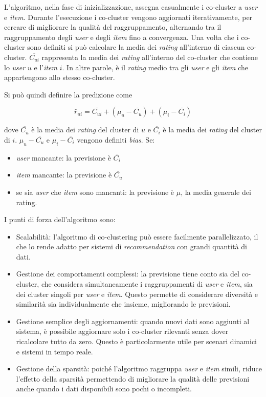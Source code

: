 L'algoritmo, nella fase di inizializzazione, assegna casualmente i co-cluster a \textit{user} e \textit{item}. Durante l'esecuzione i co-cluster vengono aggiornati iterativamente, per cercare di migliorare la qualità del raggruppamento, alternando tra il raggruppamento degli \textit{user} e degli \textit{item} fino a convergenza. Una volta che i co-cluster sono definiti si può calcolare la media dei \textit{rating} all'interno di ciascun co-cluster. $ \overline{C_{ui}} $ rappresenta la media dei \textit{rating} all'interno del co-cluster che contiene lo \textit{user} $ u $ e l'\textit{item} $ i $. In altre parole, è il \textit{rating} medio tra gli \textit{user} e gli \textit{item} che appartengono allo stesso co-cluster.

Si può quindi definire la predizione come

\[
\hat{r}_{ui} = \overline{C_{ui}} + (\mu_u - \overline{C_u}) + (\mu_i - \overline{C_i})
\]

dove $\overline{C_u}$ è la media dei \textit{rating} del cluster di $u$ e $\overline{C_i}$ è la media dei \textit{rating} del cluster di $i$. $ \mu_u - \overline{C_u} $ e $ \mu_i - \overline{C_i} $ vengono definiti \textit{bias}. Se: 
\begin{itemize}
  \item \textit{user} mancante: la previsione è $ \overline{C_i} $
  \item \textit{item} mancante: la previsione è $ \overline{C_u} $
  \item se sia \textit{user} che \textit{item} sono mancanti: la previsione è $ \mu $, la media generale dei rating.
\end{itemize}

I punti di forza dell'algoritmo sono:

\begin{itemize}
  \item Scalabilità: l'algoritmo di co-clustering può essere facilmente parallelizzato, il che lo rende adatto per sistemi di \textit{recommendation} con grandi quantità di dati.
  \item Gestione dei comportamenti complessi: la previsione tiene conto sia del co-cluster, che considera simultaneamente i raggruppamenti di \textit{user} e \textit{item}, sia dei cluster singoli per \textit{user} e \textit{item}. Questo permette di considerare diversità e similarità sia individualmente che insieme, migliorando le previsioni.
  \item Gestione semplice degli aggiornamenti: quando nuovi dati sono aggiunti al sistema, è possibile aggiornare solo i co-cluster rilevanti senza dover ricalcolare tutto da zero. Questo è particolarmente utile per scenari dinamici e sistemi in tempo reale.
  \item Gestione della sparsità: poiché l'algoritmo raggruppa \textit{user} e \textit{item} simili, riduce l'effetto della sparsità permettendo di migliorare la qualità delle previsioni anche quando i dati disponibili sono pochi o incompleti.
\end{itemize}

